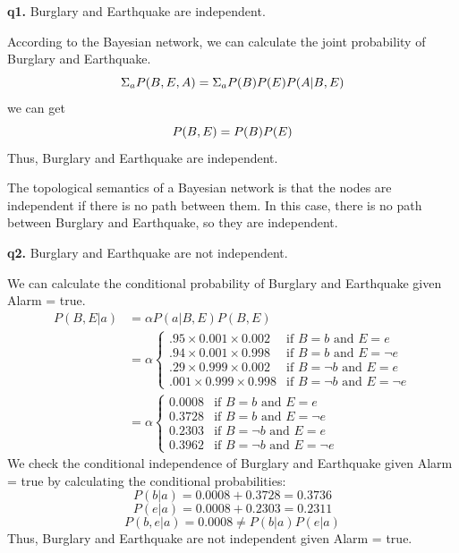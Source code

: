 \documentclass[cn,12pt]{homework}
\begin{document}
\begin{solution}
  \quad

  \textbf{q1.} Burglary and Earthquake are independent.

  According to the Bayesian network, we can calculate the joint probability of Burglary and Earthquake.
\[
\Sigma_a P(B, E, A) = \Sigma_a P(B)P(E)P(A|B,E) \\
\]
we can get
\[
P(B, E) = P(B)P(E) \\
\]
Thus, Burglary and Earthquake are independent.

  The topological semantics of a Bayesian network is that the nodes are independent if there is no path between them. In this case, there is no path between Burglary and Earthquake, so they are independent.

  \textbf{q2.} Burglary and Earthquake are not independent.

  We can calculate the conditional probability of Burglary and Earthquake given Alarm = true.
\begin{align*}
P(B, E | a) &= \alpha P(a | B, E) P(B, E) \\
&= \alpha 
\begin{cases} 
.95 \times 0.001 \times 0.002 & \text{if } B = b \text{ and } E = e \\
.94 \times 0.001 \times 0.998 & \text{if } B = b \text{ and } E = \neg e \\
.29 \times 0.999 \times 0.002 & \text{if } B = \neg b \text{ and } E = e \\
.001 \times 0.999 \times 0.998 & \text{if } B = \neg b \text{ and } E = \neg e 
\end{cases} \\
&= \alpha 
\begin{cases} 
0.0008 & \text{if } B = b \text{ and } E = e \\
0.3728 & \text{if } B = b \text{ and } E = \neg e \\
0.2303 & \text{if } B = \neg b \text{ and } E = e \\
0.3962 & \text{if } B = \neg b \text{ and } E = \neg e 
\end{cases}
\end{align*}
We check the conditional independence of Burglary and Earthquake given Alarm = true by calculating the conditional probabilities:
\[
P(b|a)=0.0008+0.3728=0.3736
\]
\[
P(e|a)=0.0008+0.2303=0.2311
\]
\[
P(b,e|a)=0.0008 \neq P(b|a)P(e|a)
\]
Thus, Burglary and Earthquake are not independent given Alarm = true.


\end{solution}
\newpage
\end{document}
